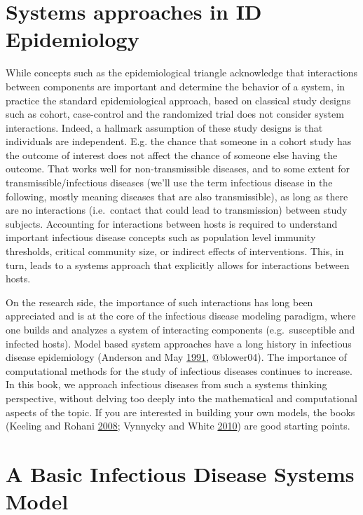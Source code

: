 \documentclass[
]{book}
\begin{document}
\hypertarget{systems-approaches-in-id-epidemiology}{%
\section{Systems approaches in ID Epidemiology}\label{systems-approaches-in-id-epidemiology}}

While concepts such as the epidemiological triangle acknowledge that interactions between components are important and determine the behavior of a system, in practice the standard epidemiological approach, based on classical study designs such as cohort, case-control and the randomized trial does not consider system interactions. Indeed, a hallmark assumption of these study designs is that individuals are independent. E.g. the chance that someone in a cohort study has the outcome of interest does not affect the chance of someone else having the outcome. That works well for non-transmissible diseases, and to some extent for transmissible/infectious diseases (we'll use the term infectious disease in the following, mostly meaning diseases that are also transmissible), as long as there are no interactions (i.e.~contact that could lead to transmission) between study subjects. Accounting for interactions between hosts is required to understand important infectious disease concepts such as population level immunity thresholds, critical community size, or indirect effects of interventions. This, in turn, leads to a systems approach that explicitly allows for interactions between hosts.

On the research side, the importance of such interactions has long been appreciated and is at the core of the infectious disease modeling paradigm, where one builds and analyzes a system of interacting components (e.g.~susceptible and infected hosts). Model based system approaches have a long history in infectious disease epidemiology (Anderson and May \protect\hyperlink{ref-anderson91}{1991}, @blower04). The importance of computational methods for the study of infectious diseases continues to increase. In this book, we approach infectious diseases from such a systems thinking perspective, without delving too deeply into the mathematical and computational aspects of the topic. If you are interested in building your own models, the books (Keeling and Rohani \protect\hyperlink{ref-keeling08}{2008}; Vynnycky and White \protect\hyperlink{ref-vynnycky10}{2010}) are good starting points.

\hypertarget{a-basic-infectious-disease-systems-model}{%
\section{A Basic Infectious Disease Systems Model}\label{a-basic-infectious-disease-systems-model}}
\end{document}
